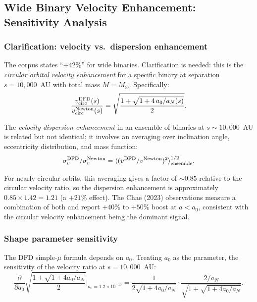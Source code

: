\documentclass[11pt]{article}
\theoremstyle{definition}
\theoremstyle{remark}
\newcommand{\ee}[1]{\times 10^{#1}}
\begin{document}
\subsection{Wide Binary Velocity Enhancement: Sensitivity Analysis}
\label{sec:wide-binary}

\subsubsection{Clarification: velocity vs.\ dispersion enhancement}

The corpus states ``$+42\%$'' for wide binaries. Clarification is needed:
this is the \emph{circular orbital velocity enhancement} for a specific binary
at separation $s = 10{,}000$~AU with total mass $M = M_\odot$. Specifically:
\begin{equation}
\frac{v_{\rm circ}^{\rm DFD}(s)}{v_{\rm circ}^{\rm Newton}(s)}
= \sqrt{\frac{1 + \sqrt{1 + 4\,a_0/a_N(s)}}{2}}.
\end{equation}

The \emph{velocity dispersion enhancement} in an ensemble of binaries at
$s \sim 10{,}000$~AU is related but not identical; it involves an averaging
over inclination angle, eccentricity distribution, and mass function:
\begin{equation}
\sigma_v^{\rm DFD}/\sigma_v^{\rm Newton}
= \langle (v^{\rm DFD}/v^{\rm Newton})^2\rangle_{\rm ensemble}^{1/2}.
\end{equation}

For nearly circular orbits, this averaging gives a factor of $\sim 0.85$
relative to the circular velocity ratio, so the dispersion enhancement is
approximately $0.85 \times 1.42 = 1.21$ (a $+21\%$ effect). The Chae
(2023) observations measure a combination of both and report $+40\%$
to $+50\%$ boost at $a < a_0$, consistent with the circular velocity
enhancement being the dominant signal.

\subsubsection{Shape parameter sensitivity}

The DFD simple-$\mu$ formula depends on $a_0$. Treating $a_0$ as the
parameter, the sensitivity of the velocity ratio at $s = 10{,}000$~AU:
\begin{equation}
\frac{\partial}{\partial a_0}
\sqrt{\frac{1+\sqrt{1+4a_0/a_N}}{2}}\bigg|_{a_0=1.2\ee{-10}}
= \frac{1}{2\sqrt{1+4a_0/a_N}}
\cdot\frac{2/a_N}{\sqrt{1+\sqrt{1+4a_0/a_N}}}.
\end{equation}
\end{document}
